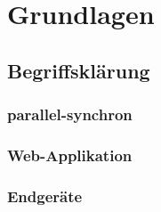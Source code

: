 \documentclass[13pt,a4paper,oneside]{scrbook} %
\newcommand{\tr}[1]{TOREMOVE-->\linebreak{#1} \linebreak <--TOREMOVE}
\begin{document}
\chapter{Grundlagen}
	\section{Begriffsklärung}	
		\subsection{parallel-synchron}
		\subsection{Web-Applikation}
		\subsection{Endgeräte}
\end{document}
